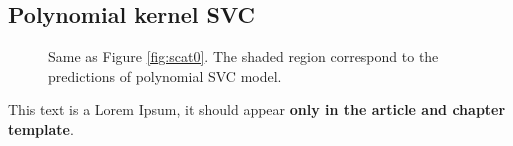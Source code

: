 \subsection{Polynomial kernel SVC}\label{polynomial-kernel-svc}

\begin{figure}

\centering
{}

\caption{Same as Figure \ref{fig:scat0}. The shaded region correspond to the predictions of polynomial SVC model.}
\end{figure}
This text is a Lorem Ipsum, it should appear \textbf{only in the article
and chapter template}.\par
\lipsum[1-3]




    
    
